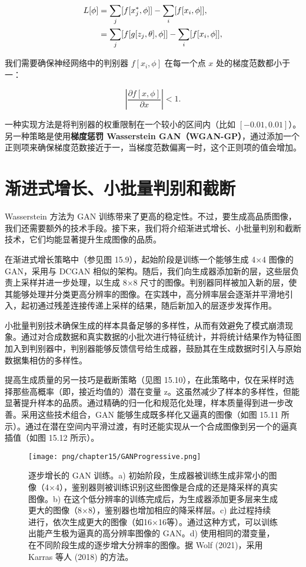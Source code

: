 \begin{align}
L[\phi] &= \sum_j [f[x_j^*, \phi]] - \sum_i [f[x_i, \phi]], \notag \\
&= \sum_j [f[g[z_j, \theta], \phi]] - \sum_i [f[x_i, \phi]], 
\end{align} 


我们需要确保神经网络中的判别器 \(f[x_i, \phi]\) 在每一个点 \(x\) 处的梯度范数都小于一：

\begin{equation}
\left| \frac{\partial f[x, \phi]}{\partial x} \right| < 1. 
\end{equation}

一种实现方法是将判别器的权重限制在一个较小的区间内（比如 \([-0.01, 0.01]\)）。另一种策略是使用\textbf{梯度惩罚 Wasserstein GAN（WGAN-GP）}，通过添加一个正则项来确保梯度范数接近于一，当梯度范数偏离一时，这个正则项的值会增加。

\section{渐进式增长、小批量判别和截断}
Wasserstein 方法为 GAN 训练带来了更高的稳定性。不过，要生成高品质图像，我们还需要额外的技术手段。接下来，我们将介绍渐进式增长、小批量判别和截断技术，它们均能显著提升生成图像的品质。

在渐进式增长策略中（参见图 15.9），起始阶段是训练一个能够生成 4×4 图像的 GAN，采用与 DCGAN 相似的架构。随后，我们向生成器添加新的层，这些层负责上采样并进一步处理，以生成 8×8 尺寸的图像。判别器同样被加入新的层，使其能够处理并分类更高分辨率的图像。在实践中，高分辨率层会逐渐并平滑地引入，起初通过残差连接传递上采样的结果，随后新加入的层逐步发挥作用。

小批量判别技术确保生成的样本具备足够的多样性，从而有效避免了模式崩溃现象。通过对合成数据和真实数据的小批次进行特征统计，并将统计结果作为特征图加入到判别器中，判别器能够反馈信号给生成器，鼓励其在生成数据时引入与原始数据集相仿的多样性。

提高生成质量的另一技巧是截断策略（见图 15.10），在此策略中，仅在采样时选择那些高概率（即，接近均值的）潜在变量 z。这虽然减少了样本的多样性，但能显著提升样本的品质。通过精确的归一化和规范化处理，样本质量得到进一步改善。采用这些技术组合，GAN 能够生成既多样化又逼真的图像（如图 15.11 所示）。通过在潜在空间内平滑过渡，有时还能实现从一个合成图像到另一个的逼真插值（如图 15.12 所示）。

\begin{figure}[ht!]
\centering
\texttt{[image: png/chapter15/GANProgressive.png]}
\caption{逐步增长的 GAN 训练。a) 初始阶段，生成器被训练生成非常小的图像（4×4），鉴别器则被训练识别这些图像是合成的还是降采样的真实图像。b) 在这个低分辨率的训练完成后，为生成器添加更多层来生成更大的图像（8×8），鉴别器也增加相应的降采样层。c) 此过程持续进行，依次生成更大的图像（如16×16等）。通过这种方式，可以训练出能产生极为逼真的高分辨率图像的 GAN。d) 使用相同的潜变量，在不同阶段生成的逐步增大分辨率的图像。据 Wolf (2021)，采用 Karras 等人 (2018) 的方法。}
\end{figure}


